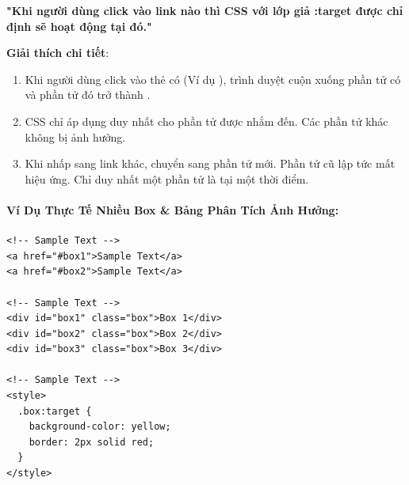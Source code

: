 \begin{conceptBox}
\textbf{"Khi người dùng click vào link nào thì CSS với lớp giả :target được chỉ định sẽ hoạt động tại đó."}

\par\vspace{4pt}
\textbf{Giải thích chi tiết}:
\begin{enumerate}[leftmargin=1.5em, itemsep=2pt, parsep=0pt]
    \item Khi người dùng click vào thẻ  có  (Ví dụ ), trình duyệt cuộn xuống phần tử có  và phần tử đó trở thành .
    \item CSS  chỉ áp dụng duy nhất cho phần tử được nhắm đến. Các phần tử  khác không bị ảnh hưởng.
    \item Khi nhấp sang link khác,  chuyển sang phần tử mới. Phần tử cũ lập tức mất hiệu ứng. Chỉ duy nhất một phần tử là  tại một thời điểm.
\end{enumerate}
\end{conceptBox}

\paragraph{Ví Dụ Thực Tế Nhiều Box \& Bảng Phân Tích Ảnh Hưởng:}

\begin{codeWindow}
\begin{lstlisting}[language=HTML5]
<!-- Sample Text -->
<a href="#box1">Sample Text</a>
<a href="#box2">Sample Text</a>

<!-- Sample Text -->
<div id="box1" class="box">Box 1</div>
<div id="box2" class="box">Box 2</div>
<div id="box3" class="box">Box 3</div>

<!-- Sample Text -->
<style>
  .box:target {
    background-color: yellow;
    border: 2px solid red;
  }
</style>
\end{lstlisting}
\end{codeWindow}

